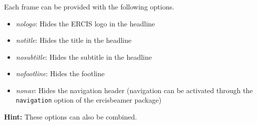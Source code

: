 \begin{frame}[label=framelayoutvariants]
    \frametitle{}
    \framesubtitle{}

    Each frame can be provided with the following options.

    \begin{itemize}
        \item \textit{nologo}: Hides the ERCIS logo in the headline
        \item \textit{notitle}: Hides the title in the headline
        \item \textit{nosubtitle}: Hides the subtitle in the headline
        \item \textit{nofootline}: Hides the footline
	\item \textit{nonav}: Hides the navigation header (navigation can be activated through the \texttt{navigation} option of the ercisbeamer package)
    \end{itemize}

    \textbf{\textcolor{ercisred}{Hint:}} These options can also be combined.
\end{frame}


